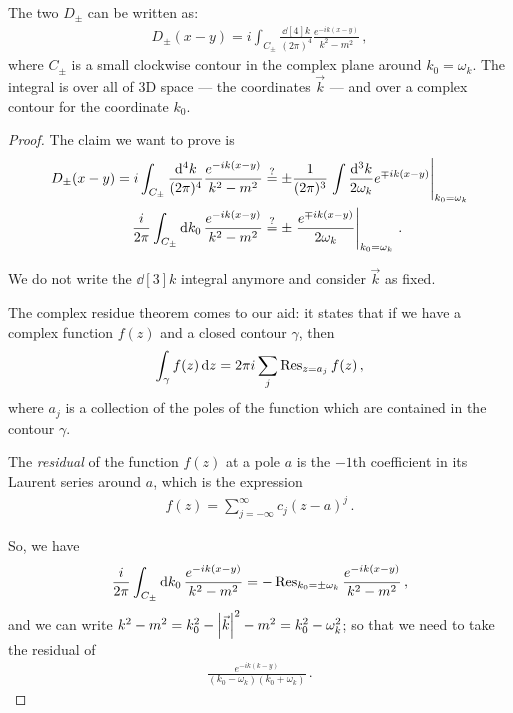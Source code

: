\documentclass[main.tex]{subfiles}
\begin{document}
\begin{claim}
The two \(D_{\pm } \) can be written as: 
%
\begin{align} \label{eq:scalar-field-propagator}
    D_{\pm } (x-y) = i \int_{C_{\pm}} \frac{ \dd[4]{k}}{(2 \pi )^{4}} \frac{e^{-ik(x-y)}}{k^2- m^2}
    \,,
\end{align}
%
where \(C_{\pm}\) is a small clockwise contour in the complex plane around \(k_0 = \omega_{k}\). The integral is over all of 3D space --- the coordinates \(\vec{k}\) --- and over a complex contour for the coordinate \(k_0 \). 
\end{claim}

\begin{proof}
The claim we want to prove is 
%
\begin{align}
D_{\pm} (x-y) 
= i \int_{C_{\pm}} \frac{ \dd[4]{k}}{(2\pi )^{4}}
\frac{e^{-ik(x-y)}}{k^2 - m^2}
&\overset{?}{=}
\pm \frac{1}{(2 \pi)^3} \eval{\int \frac{ \dd[3]{k}}{2 \omega_{k}} e^{\mp ik (x-y)}}_{k_0 = \omega_{k}}  \\
\frac{i}{2 \pi }
\int_{C_{\pm}} \dd{k_0 } \frac{e^{-ik(x-y)}}{k^2-m^2}
&\overset{?}{=}
\pm \eval{\frac{e^{\mp ik(x-y)}}{2 \omega_{k}}}_{k_0 = \omega_{k}}
\,.
\end{align}

We do not write the \(\dd[3]{k}\) integral anymore and consider \(\vec{k}\) as fixed. 

The complex residue theorem comes to our aid: it states that if we have a complex function \(f(z)\) and a closed contour \(\gamma \), then 
%
\begin{align}
\int_{\gamma } f(z) \dd{z} = 2 \pi i \sum _{j} \Res_{z = a_j} f(z)
\,,
\end{align}
%
where \(a_j\) is a collection of the poles of the function which are contained in the contour \(\gamma \). 

The \emph{residual} of the function \(f(z)\) at a pole \(a\) is the \(-1\)th coefficient in its Laurent series around \(a\), which is the expression 
%
\begin{align}
f(z) = \sum _{j= - \infty }^{ \infty } c_j (z-a)^{j}
\,.
\end{align}

So, we have 
%
\begin{align}
\frac{i}{2 \pi } 
\int_{C_{\pm}} \dd{k_0} 
\frac{e^{-ik(x-y)}}{k^2-m^2} 
= - \Res_{k_0 = \pm \omega_{k}} 
\frac{e^{-ik(x-y)}}{k^2-m^2} 
\,,
\end{align}
%
and we can write \(k^2 - m^2 = k_0^2 - \abs{\vec{k}}^2 - m^2 = k_0^2 - \omega_{k}^2\); so that we need to take the residual of 
%
\begin{align}
\frac{e^{-ik(k-y)}}{(k_0 - \omega_{k}) (k_0 + \omega_{k})}
\,.
\end{align}


\end{proof}
\end{document}
